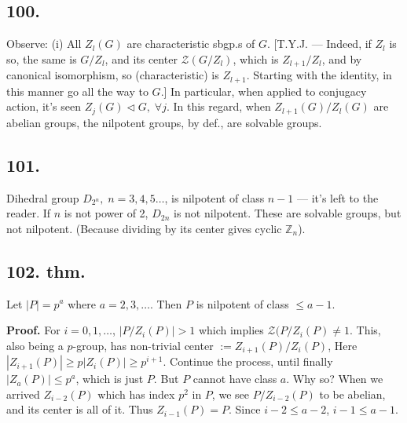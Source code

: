 \documentclass[12pt]{article}
\newcommand\Ev\forall%
\newcommand{\BF}[1]{ \mathbb{#1} }%
\newcommand{\SF}[1]{ \mathscr{#1} }%
\newcommand{\Ss}[1]{\textsf{\textbf{#1}}}%
\begin{document}
\subsection*{100.} Observe: (i) All \(Z_l(G)\) are characteristic sbgp.s of \(G\). 
[T.Y.J. --- Indeed, if \(Z_l\) is so, the same is \(G/Z_l\), and its center \(\SF Z(G/Z_l)\), which is \(Z_{l+1} / Z_l\), 
and by canonical isomorphism, so (characteristic) is \(Z_{l+1}\). 
Starting with the identity, in this manner go all the way to \(G\).] 
In particular, when applied to conjugacy action, it's seen \(Z_j(G) \lhd G,\; \Ev j\). 
In this regard, when \(Z_{l+1}(G) / Z_l(G)\) are abelian groups, the nilpotent groups, by def., are solvable groups. 

\subsection*{101.} Dihedral group \(D_{2^n},\; n=3,4,5\dotsc\), is nilpotent of class \(n-1\) --- it's left to the reader. 
If \(n\) is not power of 2, \(D_{2n}\) is not nilpotent. 
These are solvable groups, but not nilpotent. 
(Because dividing by its center gives cyclic \(\BF Z_n\)). \par

\subsection*{102. thm.} Let \(|P| = p^a\) where \(a = 2,3,\dotsc\). 
Then \(P\) is nilpotent of class \(\leq a-1\). \par
\Ss{Proof.} For \(i= 0,1,\dotsc\), \(|P/Z_i(P)| >1\) which implies \(\SF Z(P/Z_i(P) \neq 1\). 
This, also being a \(p\)-group, has non-trivial center \(:= Z_{i+1}(P)/Z_i(P)\), 
Here \(|Z_{i+1}(P)| \geq p|Z_i(P)| \geq p^{i+1}\). 
Continue the process, until finally \(|Z_a(P)| \leq p^a\), which is just \(P\). 
But \(P\) cannot have class \(a\). 
Why so? When we arrived \(Z_{i-2}(P)\) which has index \(p^2\) in \(P\), 
we see \(P/Z_{i-2}(P)\) to be abelian, and its center is all of it. 
Thus \(Z_{i-1}(P) =P\). 
Since \(i-2 \leq a-2\), \(i-1 \leq a-1\). 
\end{document}
